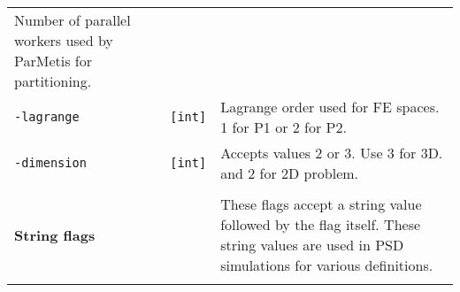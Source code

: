 \begin{longtable}[]{@{}lll@{}}
\begin{minipage}[t]{0.56\columnwidth}
Number of parallel workers used by ParMetis for partitioning.\strut
\end{minipage}\tabularnewline
\begin{minipage}[t]{0.26\columnwidth}\raggedright\strut
\lstinline!-lagrange!\strut
\end{minipage} & \begin{minipage}[t]{0.09\columnwidth}\raggedright\strut
\lstinline![int]!\strut
\end{minipage} & \begin{minipage}[t]{0.56\columnwidth}\raggedright\strut
Lagrange order used for FE spaces. 1 for P1 or 2 for P2.\strut
\end{minipage}\tabularnewline
\begin{minipage}[t]{0.26\columnwidth}\raggedright\strut
\lstinline!-dimension!\strut
\end{minipage} & \begin{minipage}[t]{0.09\columnwidth}\raggedright\strut
\lstinline![int]!\strut
\end{minipage} & \begin{minipage}[t]{0.56\columnwidth}\raggedright\strut
Accepts values 2 or 3. Use 3 for 3D. and 2 for 2D problem.\strut
\end{minipage}\tabularnewline
\begin{minipage}[t]{0.26\columnwidth}\raggedright\strut
\strut
\end{minipage} & \begin{minipage}[t]{0.09\columnwidth}\raggedright\strut
\strut
\end{minipage} & \begin{minipage}[t]{0.56\columnwidth}\raggedright\strut
\strut
\end{minipage}\tabularnewline
\begin{minipage}[t]{0.26\columnwidth}\raggedright\strut
\textbf{String flags}\strut
\end{minipage} & \begin{minipage}[t]{0.09\columnwidth}\raggedright\strut
\strut
\end{minipage} & \begin{minipage}[t]{0.56\columnwidth}\raggedright\strut
These flags accept a string value followed by the flag itself. These
string values are used in PSD simulations for various definitions.\strut
\end{minipage}\tabularnewline
\begin{minipage}[t]{0.26\columnwidth}\raggedright\strut
\strut
\end{minipage} & \begin{minipage}[t]{0.09\columnwidth}\raggedright\strut

\end{minipage}
\end{longtable}
